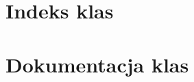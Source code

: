 \documentclass{article}
\begin{document}
\section{Indeks klas}

\section{Dokumentacja klas}









\printindex
\end{document}
